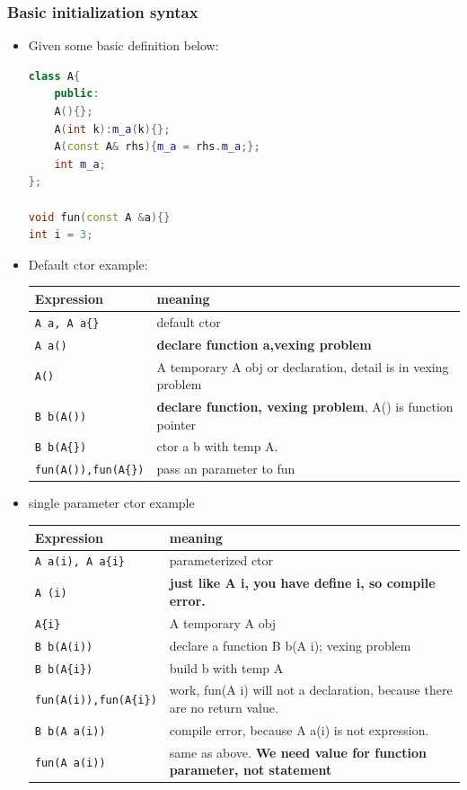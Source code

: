 \documentclass[a4paper,11pt,twoside]{book}
\newcommand{\tophline}{\hline }
\newcommand{\bottomhline}{\\ \hline }
\newcommand{\tophline}{ }
\newcommand{\bottomhline}{ }
\begin{document}
\subsubsection{Basic initialization syntax}
\begin{itemize}
	\item Given some basic definition below: 
\begin{lstlisting}[frame=single, language=c++]
class A{
	public:
	A(){};
	A(int k):m_a(k){};
	A(const A& rhs){m_a = rhs.m_a;};
	int m_a;
};

void fun(const A &a){}
int i = 3;	
\end{lstlisting}	
	
	\item Default ctor example: \newline
	\begin{tabular}{|p{}|p{}|}
		\tophline
		Expression & meaning \\
		\tophline
		\texttt{A a, A a\{\}} & default ctor \\
		\tophline
		\texttt{A a()} & \textbf{declare function a,vexing problem} \\
		\tophline
		\texttt{A()} & A temporary A obj or declaration, detail is in vexing problem \\
		\tophline
		\texttt{B b(A())} & \textbf{declare function, vexing problem}, A() is function pointer \\
		\tophline
		\texttt{B b(A\{\})} & ctor a b with temp A. \\
		\tophline
		\texttt{fun(A()),fun(A\{\})} & pass an parameter to fun
		\bottomhline
	\end{tabular}
	\item single parameter ctor example \newline
	
	\begin{tabular}{|p{}|p{}|}
		\tophline
		Expression & meaning \\
		\tophline
		\texttt{A a(i), A a\{i\}} & parameterized ctor\\
		\tophline
		\texttt{A (i)} & \textbf{just like A i, you have define i, so compile error.} \\
		\tophline
		\texttt{A\{i\}} & A temporary A obj\\
		\tophline
		\texttt{B b(A(i))} & declare a function B b(A i); vexing problem \\
		\tophline
		\texttt{B b(A\{i\})} & build b with temp A\\
		\tophline
		\texttt{fun(A(i)),fun(A\{i\})} & work, fun(A i) will not a declaration, because there are no return value.\\
		\tophline
		\texttt{B b(A a(i))}  & compile error, because A a(i) is not expression. \\
		\tophline
		\texttt{fun(A a(i))} & same as above. \textbf{We need value for function parameter, not statement} 
		\bottomhline
	\end{tabular}
	

\end{itemize}
\end{document}
